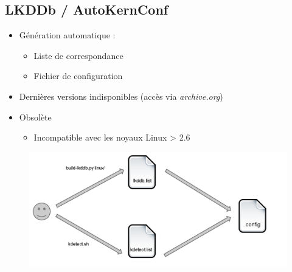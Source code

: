 \documentclass[11pt]{beamer}
\begin{document}
\subsection{LKDDb / AutoKernConf}
\begin{frame}
    \begin{itemize}
        \item Génération automatique :
            \begin{itemize}
                \item Liste de correspondance
                \item Fichier de configuration
            \end{itemize}
    	\vspace{0.5cm}
        \item Dernières versions indisponibles (accès via \textit{archive.org})
    	\vspace{0.5cm}
        \item Obsolète
            \begin{itemize}
                \item Incompatible avec les noyaux Linux > 2.6
            \end{itemize}
    \end{itemize}
\end{frame}

\begin{frame}
    \begin{figure}
        \includegraphics[scale=0.28]{screen_lkddb.png}
        \centering
    \end{figure}
\end{frame}
\end{document}
